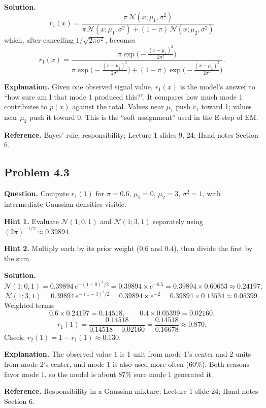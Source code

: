 \documentclass[11pt]{article}
\begin{document}
\textbf{Solution.}
\[
r_1(x) = \frac{\pi\,\mathcal{N}(x;\mu_1,\sigma^2)}{\pi\,\mathcal{N}(x;\mu_1,\sigma^2) + (1-\pi)\,\mathcal{N}(x;\mu_2,\sigma^2)}
\]
which, after cancelling $1/\sqrt{2\pi\sigma^2}$, becomes
\[
r_1(x) = \frac{\pi\exp\!\big(-\frac{(x-\mu_1)^2}{2\sigma^2}\big)}{\pi\exp\!\big(-\frac{(x-\mu_1)^2}{2\sigma^2}\big) + (1-\pi)\exp\!\big(-\frac{(x-\mu_2)^2}{2\sigma^2}\big)}.
\]

\textbf{Explanation.} Given one observed signal value, $r_1(x)$ is the model's answer to ``how sure am I that mode 1 produced this?''. It compares how much mode 1 contributes to $p(x)$ against the total. Values near $\mu_1$ push $r_1$ toward 1; values near $\mu_2$ push it toward 0. This is the ``soft assignment'' used in the E-step of EM.

\textbf{Reference.} Bayes' rule; responsibility; Lecture 1 slides 9, 24; Hand notes Section 6.

\subsection*{Problem 4.3}
\textbf{Question.} Compute $r_1(1)$ for $\pi=0.6$, $\mu_1=0$, $\mu_2=3$, $\sigma^2=1$, with intermediate Gaussian densities visible.

\textbf{Hint 1.} Evaluate $\mathcal{N}(1;0,1)$ and $\mathcal{N}(1;3,1)$ separately using $(2\pi)^{-1/2}\approx 0.39894$.

\textbf{Hint 2.} Multiply each by its prior weight ($0.6$ and $0.4$), then divide the first by the sum.

\textbf{Solution.}
\[
\mathcal{N}(1;0,1) = 0.39894\,e^{-(1-0)^2/2} = 0.39894\times e^{-0.5} = 0.39894\times 0.60653 \approx 0.24197,
\]
\[
\mathcal{N}(1;3,1) = 0.39894\,e^{-(1-3)^2/2} = 0.39894\times e^{-2} = 0.39894\times 0.13534 \approx 0.05399.
\]
Weighted terms:
\[
0.6\times 0.24197 = 0.14518, \qquad 0.4\times 0.05399 = 0.02160.
\]
\[
r_1(1) = \frac{0.14518}{0.14518 + 0.02160} = \frac{0.14518}{0.16678} \approx 0.870.
\]
Check: $r_2(1) = 1 - r_1(1) \approx 0.130$.

\textbf{Explanation.} The observed value $1$ is 1 unit from mode 1's center and 2 units from mode 2's center, and mode 1 is also used more often (60\%). Both reasons favor mode 1, so the model is about 87\% sure mode 1 generated it.

\textbf{Reference.} Responsibility in a Gaussian mixture; Lecture 1 slide 24; Hand notes Section 6.

\end{document}
